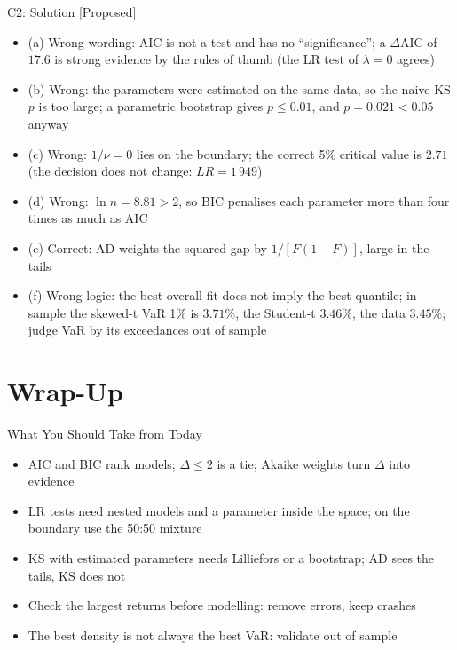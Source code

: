 \ifsolutions
\begin{frame}{C2: Solution [Proposed]}
\itemsize{\footnotesize}
\begin{itemize}
    \item (a) Wrong wording: AIC is not a test and has no ``significance''; a $\Delta$AIC of $17.6$ is strong evidence by the rules of thumb (the LR test of $\lambda = 0$ agrees)
    \item (b) Wrong: the parameters were estimated on the same data, so the naive KS $p$ is too large; a parametric bootstrap gives $p \le 0.01$, and $p = 0.021 < 0.05$ anyway
    \item (c) Wrong: $1/\nu = 0$ lies on the boundary; the correct 5\% critical value is $2.71$ (the decision does not change: $LR = 1\,949$)
    \item (d) Wrong: $\ln n = 8.81 > 2$, so BIC penalises each parameter more than four times as much as AIC
    \item (e) Correct: AD weights the squared gap by $1/[F(1 - F)]$, large in the tails
    \item (f) Wrong logic: the best overall fit does not imply the best quantile; in sample the skewed-t VaR 1\% is $3.71\%$, the Student-t $3.46\%$, the data $3.45\%$; judge VaR by its exceedances out of sample
\end{itemize}
\end{frame}
\fi


\section{Wrap-Up}

\begin{frame}{What You Should Take from Today}
\itemsize{\small}
\begin{itemize}
    \item AIC and BIC rank models; $\Delta \le 2$ is a tie; Akaike weights turn $\Delta$ into evidence
    \item LR tests need nested models and a parameter inside the space; on the boundary use the 50:50 mixture
    \item KS with estimated parameters needs Lilliefors or a bootstrap; AD sees the tails, KS does not
    \item Check the largest returns before modelling: remove errors, keep crashes
    \item The best density is not always the best VaR: validate out of sample
\end{itemize}
\end{frame}


